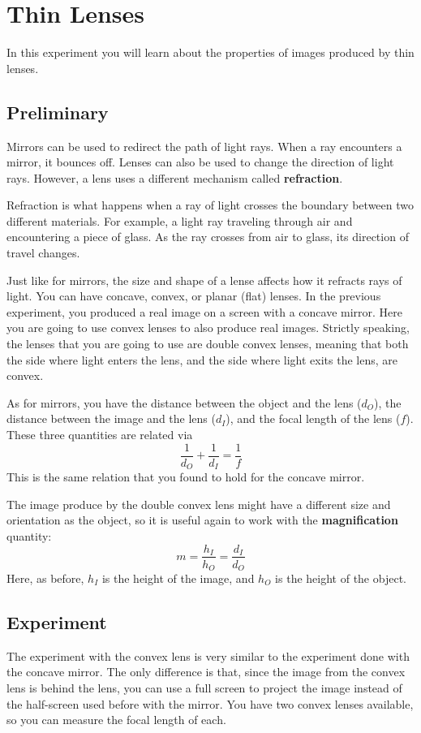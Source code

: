 \setcounter{chapter}{7}
\chapter{Thin Lenses}
%
In this experiment you will learn about the properties of images produced by thin lenses.
%
\section{Preliminary}
%
Mirrors can be used to redirect the path of light rays. When a ray encounters a mirror, it bounces off. Lenses can also be used to change the direction of light rays. However, a lens uses a different mechanism called \textbf{refraction}.

Refraction is what happens when a ray of light crosses the boundary between two different materials. For example, a light ray traveling through air and encountering a piece of glass. As the ray crosses from air to glass, its direction of travel changes.

Just like for mirrors, the size and shape of a lense affects how it refracts rays of light. You can have concave, convex, or planar (flat) lenses. In the previous experiment, you produced a real image on a screen with a concave mirror. Here you are going to use convex lenses to also produce real images. Strictly speaking, the lenses that you are going to use are double convex lenses, meaning that both the side where light enters the lens, and the side where light exits the lens, are convex.

As for mirrors, you have the distance between the object and the lens ($d_{O}$), the distance between the image and the lens ($d_{I}$), and the focal length of the lens ($f$). These three quantities are related via
\begin{equation}
    \frac{1}{d_{O}} + \frac{1}{d_{I}} = \frac{1}{f}
\end{equation}
This is the same relation that you found to hold for the concave mirror.

The image produce by the double convex lens might have a different size and orientation as the object, so it is useful again to work with the \textbf{magnification} quantity:
\begin{equation}
    m = \frac{h_{I}}{h_{O}} = \frac{d_{I}}{d_{O}}
\end{equation}
Here, as before, $h_{I}$ is the height of the image, and $h_{O}$ is the height of the object.
%
\section{Experiment}
%
The experiment with the convex lens is very similar to the experiment done with the concave mirror. The only difference is that, since the image from the convex lens is behind the lens, you can use a full screen to project the image instead of the half-screen used before with the mirror. You have two convex lenses available, so you can measure the focal length of each.
%
